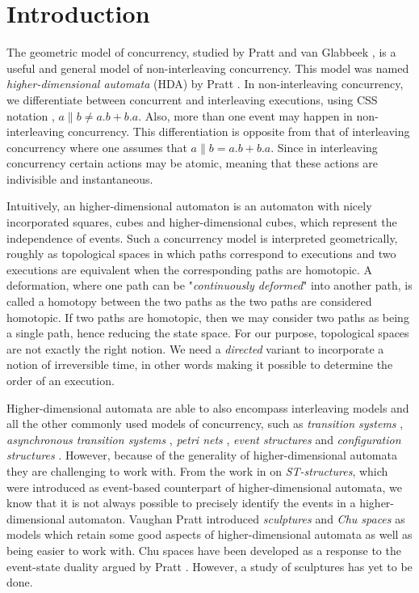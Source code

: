 \newpage
\chapter{Introduction}
    
    The geometric model of concurrency, studied by Pratt and van Glabbeek \cite{Pratt00Sculptures, pratt91hda, Glabbeek06HDA}, is a useful and general model of non-interleaving concurrency. This model was named \emph{higher-dimensional automata} (HDA) by Pratt \cite{pratt91hda}. In non-interleaving concurrency, we differentiate between concurrent and interleaving executions, using CSS notation \cite{Milner83SCCS}, $a \parallel b \neq a.b + b.a$. Also, more than one event may happen in non-interleaving concurrency. This differentiation is opposite from that of interleaving concurrency where one assumes that $a \parallel b = a.b + b.a$. Since in interleaving concurrency certain actions may be atomic, meaning that these actions are indivisible and instantaneous.
    
    Intuitively, an higher-dimensional automaton is an automaton with nicely incorporated squares, cubes and higher-dimensional cubes, which represent the independence of events. Such a concurrency model is interpreted geometrically, roughly as topological spaces in which paths correspond to executions and two executions are equivalent when the corresponding paths are homotopic. A deformation, where one path can be "\emph{continuously deformed}" into another path, is called a homotopy between the two paths as the two paths are considered homotopic. If two paths are homotopic, then we may consider two paths as being a single path, hence reducing the state space. For our purpose, topological spaces are not exactly the right notion. We need a \emph{directed} variant to incorporate a notion of irreversible time, in other words making it possible to determine the order of an execution.
    
    Higher-dimensional automata are able to also encompass interleaving models and all the other commonly used models of concurrency, such as \emph{transition systems} \cite{winskel95modelsCategory}, \emph{asynchronous transition systems} \cite{Shields85}, \emph{petri nets} \cite{Petri73petrinets}, \emph{event structures} \cite{NielsenPW81eventstructures} and \emph{configuration structures} \cite{GlabbeekP09configStruct}. However, because of the generality of higher-dimensional automata they are challenging to work with. From the work in \cite{Johansen16STstruct} on \emph{ST-structures}, which were introduced as event-based counterpart of higher-dimensional automata, we know that it is not always possible to precisely identify the events in a higher-dimensional automaton. Vaughan Pratt introduced \emph{sculptures} \cite{Pratt00Sculptures} and \emph{Chu spaces} \cite{gupta94phd_Chu, pratt95Chu} as models which retain some good aspects of higher-dimensional automata as well as being easier to work with. Chu spaces have been developed as a response to the event-state duality argued by Pratt \cite{Pratt02eventStateDuality}. However, a study of sculptures has yet to be done.
    
